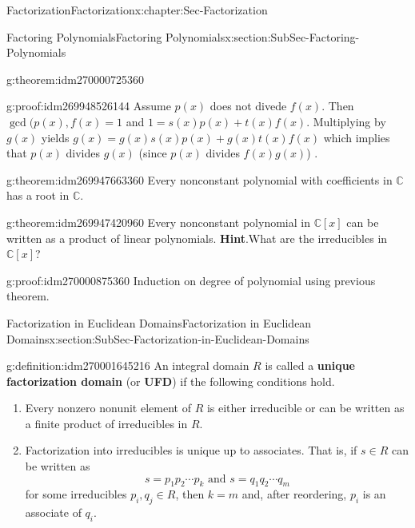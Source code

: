 \documentclass[oneside,10pt,]{book}
\newcommand{\terminology}[1]{\textbf{#1}}
\numberwithin{equation}{section}
\def\C{{\mathbb C}}
\begin{document}
\begin{chapterptx}{Factorization}{}{Factorization}{}{}{x:chapter:Sec-Factorization}
\begin{sectionptx}{Factoring Polynomials}{}{Factoring Polynomials}{}{}{x:section:SubSec-Factoring-Polynomials}
\begin{theorem}{}{}{g:theorem:idm270000725360}
\end{theorem}
\begin{proofptx}{}{g:proof:idm269948526144}
Assume \(p(x)\) does not divede \(f(x)\). Then \(\gcd(p(x),f(x)=1\) and \(1=s(x)p(x)+t(x)f(x)\). Multiplying by \(g(x)\) yields \(g(x)=g(x)s(x)p(x)+g(x)t(x)f(x)\) which implies that \(p(x)\) divides \(g(x)\) (since \(p(x)\) divides \(f(x)g(x)\)) .%
\end{proofptx}
\begin{theorem}{}{}{g:theorem:idm269947663360}%
Every nonconstant polynomial with coefficients in \(\C\) has a root in \(\C\).%
\end{theorem}
\begin{theorem}{}{}{g:theorem:idm269947420960}%
Every nonconstant polynomial in \(\C[x]\) can be written as a product of linear polynomials.%
\textbf{Hint}.\quad{}What are the irreducibles in \(\C[x]\)?%
\end{theorem}
\begin{proofptx}{}{g:proof:idm270000875360}
Induction on degree of polynomial using previous theorem.%
\end{proofptx}
\end{sectionptx}
%
%
\typeout{************************************************}
\typeout{************************************************}
%
\begin{sectionptx}{Factorization in Euclidean Domains}{}{Factorization in Euclidean Domains}{}{}{x:section:SubSec-Factorization-in-Euclidean-Domains}
\begin{definition}{}{g:definition:idm270001645216}%
An integral domain \(R\) is called a \terminology{unique factorization domain} (or \terminology{UFD}) if the following conditions hold.%
\begin{enumerate}
\item{}Every nonzero nonunit element of \(R\) is either irreducible or can be written as a finite product of irreducibles in \(R\).%
\item{}Factorization into irreducibles is unique up to associates. That is, if \(s\in R\) can be written as%
\begin{equation*}
s = p_1 p_2 \cdots p_k \text{ and }  s = q_1 q_2 \cdots q_m
\end{equation*}
for some irreducibles \(p_i, q_j\in R\), then \(k=m\) and, after reordering, \(p_i\) is an associate of \(q_i\).%
\end{enumerate}
%
\end{definition}

\end{sectionptx}
\end{chapterptx}
\end{document}
